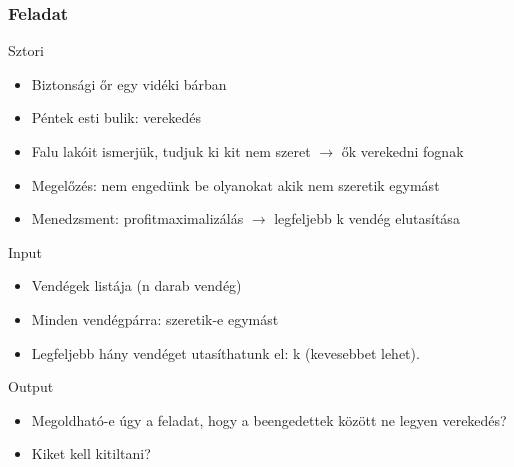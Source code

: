 \begin{frame}
\frametitle{Feladat}

Sztori
\begin{itemize}
\item Biztonsági őr egy vidéki bárban
\item Péntek esti bulik: verekedés
\item Falu lakóit ismerjük, tudjuk ki kit nem szeret $\rightarrow$ ők verekedni fognak
\item Megelőzés: nem engedünk be olyanokat akik nem szeretik egymást
\item Menedzsment: profitmaximalizálás $\rightarrow$ legfeljebb k vendég elutasítása
\end{itemize}

Input
\begin{itemize}
\item Vendégek listája (n darab vendég)
\item Minden vendégpárra: szeretik-e egymást
\item Legfeljebb hány vendéget utasíthatunk el: k (kevesebbet lehet).
\end{itemize}

Output
\begin{itemize}
\item Megoldható-e úgy a feladat, hogy a beengedettek között ne legyen verekedés?
\item Kiket kell kitiltani?
\end{itemize}

\end{frame}

